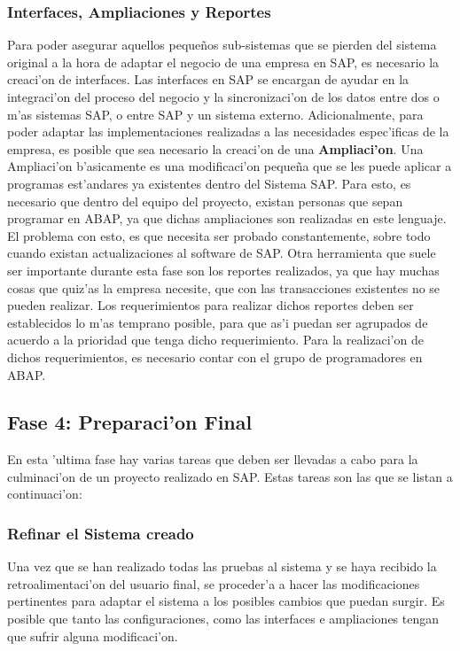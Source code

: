 \subsubsection{Interfaces, Ampliaciones y Reportes}

	Para poder asegurar aquellos peque\~nos sub-sistemas que se pierden del sistema original a la hora de adaptar el negocio de una empresa en SAP, es necesario la creaci'on de interfaces. Las interfaces en SAP se encargan de ayudar en la integraci'on del proceso del negocio y la sincronizaci'on de los datos entre dos o m'as sistemas SAP, o entre SAP y un sistema externo.
	Adicionalmente, para poder adaptar las implementaciones realizadas a las necesidades espec'ificas de la empresa, es posible que sea necesario la creaci'on de una \textbf{Ampliaci'on}. Una Ampliaci'on b'asicamente es una modificaci'on peque\~na que se les puede aplicar a programas est'andares ya existentes dentro del Sistema SAP. Para esto, es necesario que dentro del equipo del proyecto, existan personas que sepan programar en ABAP, ya que dichas ampliaciones son realizadas en este lenguaje. El problema con esto, es que necesita ser probado constantemente, sobre todo cuando existan actualizaciones al software de SAP. 
	Otra herramienta que suele ser importante durante esta fase son los reportes realizados, ya que hay muchas cosas que quiz'as la empresa necesite, que con las transacciones existentes no se pueden realizar.
	Los requerimientos para realizar dichos reportes deben ser establecidos lo m'as temprano posible, para que as'i puedan ser agrupados de acuerdo a la prioridad que tenga dicho requerimiento. Para la realizaci'on de dichos requerimientos, es necesario contar con el grupo de programadores en ABAP. 
	
\subsection{Fase 4: Preparaci'on Final}
	En esta 'ultima fase hay varias tareas que deben ser llevadas a cabo para la culminaci'on de un proyecto realizado en SAP. Estas tareas son las que se listan a continuaci'on:
	
\subsubsection{Refinar el Sistema creado}
	Una vez que se han realizado todas las pruebas al sistema y se haya recibido la retroalimentaci'on del usuario final, se proceder'a a hacer las modificaciones pertinentes para adaptar el sistema a los posibles cambios que puedan surgir. Es posible que tanto las configuraciones, como las interfaces e ampliaciones tengan que sufrir alguna modificaci'on.
	 

